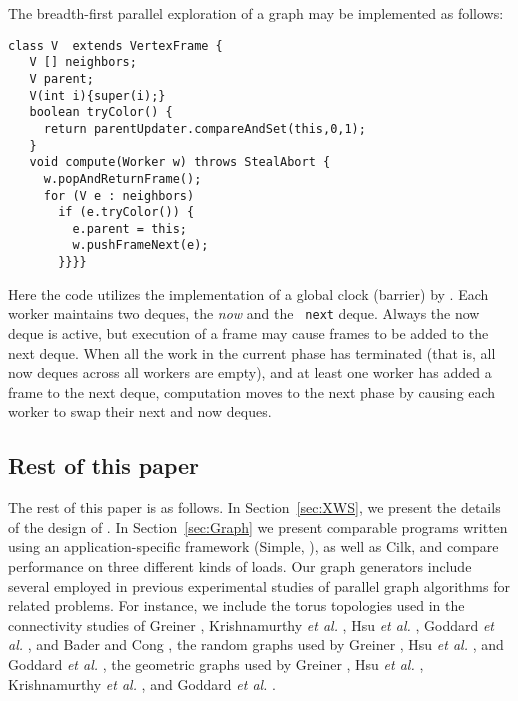 \begin{example}[BFS] \label{example:bfs}

The breadth-first parallel exploration of a graph may be implemented
as follows:
{\footnotesize
\begin{verbatim}
class V  extends VertexFrame {
   V [] neighbors;
   V parent;
   V(int i){super(i);}
   boolean tryColor() {
     return parentUpdater.compareAndSet(this,0,1);
   }
   void compute(Worker w) throws StealAbort {
     w.popAndReturnFrame();
     for (V e : neighbors) 
       if (e.tryColor()) {
         e.parent = this;
         w.pushFrameNext(e);
       }}}}
\end{verbatim}}

Here the code utilizes the implementation of a global clock (barrier)
by \XWS. Each worker maintains two deques, the {\em now} and the {\tt
next} deque. Always the now deque is active, but execution of a frame
may cause frames to be added to the next deque.  When all the work in
the current phase has terminated (that is, all now deques across all
workers are empty), and at least one worker has added a frame to the
next deque, computation moves to the next phase by causing each worker
to swap their next and now deques.
\end{example}


\subsection{Rest of this paper}

The rest of this paper is as follows. In Section~\ref{sec:XWS}, we
present the details of the design of \XWS. In Section~\ref{sec:Graph}
we present comparable programs written using an application-specific
framework (Simple, \cite{BC04a}), as well as Cilk, and compare
performance on three different kinds of loads. 
Our graph generators include several employed in previous
experimental studies of parallel graph algorithms for related
problems. For instance, we include the torus topologies used in the
connectivity studies of Greiner \cite{Gre94}, Krishnamurthy \emph{et
al.} \cite{KLC97}, Hsu \emph{et al.} \cite{HRD97}, Goddard \emph{et
al.} \cite{GKP97}, and Bader and Cong \cite{BC04b}, the random graphs
used by Greiner \cite{Gre94}, Hsu \emph{et al.}  \cite{HRD97}, and
Goddard \emph{et al.} \cite{GKP97}, the geometric graphs used by
Greiner \cite{Gre94}, Hsu \emph{et al.} \cite{HRD97}, Krishnamurthy
\emph{et al.} \cite{KLC97}, and Goddard \emph{et al.} \cite{GKP97}.

